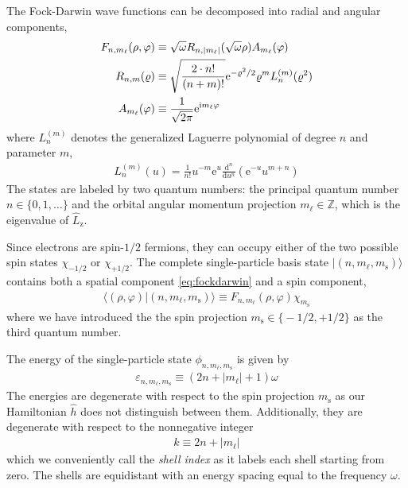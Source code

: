 The Fock-Darwin wave functions can be decomposed into radial and angular components,\cite[Appx.\ A]{lohne2010coupled}
\begin{align}
  F_{n, m_\ell}(\rho, \varphi) &\equiv \sqrt\omega R_{n, |m_\ell|}(\sqrt \omega \rho) A_{m_\ell}(\varphi) \label{eq:fockdarwin} \\
  R_{n, m}(\varrho) &\equiv \sqrt{\frac{2 \cdot n!}{(n + m)!}} \mathrm{e}^{-\varrho^2 / 2} \varrho^m L_n^{(m)}(\varrho^2) \notag \\
  A_{m_\ell}(\varphi) &\equiv \frac{1}{\sqrt{2 \pi}} \mathrm{e}^{\mathrm{i} m_\ell \varphi} \notag
\end{align}
where $L_n^{(m)}$ denotes the generalized Laguerre polynomial of degree $n$ and parameter $m$,
\begin{align*}
  L_n^{(m)}(u) = \frac{1}{n!} u^{-m} \mathrm{e}^u \frac{\mathrm{d}^n}{\mathrm{d} u^n} (\mathrm{e}^{-u} u^{m + n})
\end{align*}
The states are labeled by two quantum numbers: the principal quantum number $n \in \{0, 1, \ldots\}$ and the orbital angular momentum projection $m_\ell \in \mathbb Z$, which is the eigenvalue of $\hat{L}_{\mathrm{z}}$.

Since electrons are spin-$1/2$ fermions, they can occupy either of the two possible spin states $\chi_{-1/2}$ or $\chi_{+1/2}$.  The complete single-particle basis state $| (n, m_\ell, m_{\mathrm{s}}) \rangle$ contains both a spatial component \eqref{eq:fockdarwin} and a spin component,
\begin{align} \label{eq:singleparticlestate}
  \langle (\rho, \varphi) | (n, m_\ell, m_{\mathrm{s}}) \rangle \equiv F_{n, m_\ell}(\rho, \varphi) \chi_{m_{\mathrm{s}}}
\end{align}
where we have introduced the the spin projection $m_{\mathrm{s}} \in \bigl\{-1/2, +1/2\bigr\}$ as the third quantum number.

The energy of the single-particle state $\phi_{n, m_\ell, m_{\mathrm{s}}}$ is given by
\begin{align*}
  \varepsilon_{n, m_\ell, m_{\mathrm{s}}} \equiv (2 n + |m_\ell| + 1) \omega
\end{align*}
The energies are degenerate with respect to the spin projection $m_{\mathrm{s}}$ as our Hamiltonian $\hat{h}$ does not distinguish between them.  Additionally, they are degenerate with respect to the nonnegative integer
\begin{align} \label{eq:shell_index}
  k \equiv 2 n + |m_\ell|
\end{align}
which we conveniently call the \textit{shell index} as it labels each shell starting from zero.  The shells are equidistant with an energy spacing equal to the frequency $\omega$.

